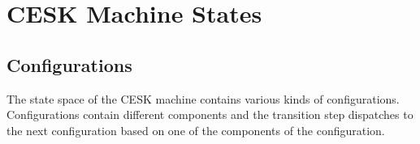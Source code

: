 \documentclass[a4paper,oneside,fleqn]{article}
\begin{document}
\section{CESK Machine States}
\subsection{Configurations}
\label{subsec:cesk-configs}

The state space of the CESK machine contains various kinds of configurations.
Configurations contain different components and the transition step dispatches to the next configuration based on one of the components of the configuration.

\newcommand{\breakconf}[1]{\confsingle{#1}_{\mathrm{breakCont}}}
\newcommand{\switchconf}[1]{\confsingle{#1}_{\mathrm{switchCont}}}
\newcommand{\contconf}[2]{\confpair{#1}{#2}_{\mathrm{cont}}}
\newcommand{\scontconf}[2]{\confpair{#1}{#2}_{\mathrm{scont}}}
\newcommand{\acontconf}[2]{\confpair{#1}{#2}_{\mathrm{acont}}}
\newcommand{\throwconf}[3]{\conftriple{#1}{#2}{#3}_{\mathrm{throw}}}
\newcommand{\evallistconf}[6]{\langle{#1},\,{#2},\,{#3},\handler,\,{#4},\,{#5},\,{#6}\rangle_{\mathrm{evalList}}}
\newcommand{\evalconf}[6]{\langle{#1},\,{#2},\,{#3},\handler,\,{#4},\,{#5},\,{#6}\rangle_{\mathrm{eval}}}
\newcommand{\execconf}[9]{\langle{#1},\,{#2},\,{#3},\,{#4},\,{#5},\,{#6},\,{#7},\,{#8},\,{#9}\rangle_{\mathrm{exec}}}
\newcommand{\eventconf}[2]{\langle{#1},\,{#2}\rangle_{\mathrm{event}}}
\end{document}
